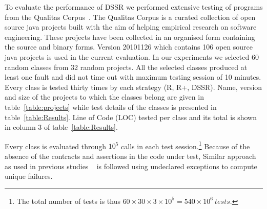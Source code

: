 \documentclass{acm_proc_article-sp}
\begin{document}
To evaluate the performance of DSSR we performed extensive testing of programs from the Qualitas Corpus~\cite{Tempero2010a}. The Qualitas Corpus is a curated collection of open source java projects built with the aim of helping empirical research on  software engineering. These projects have been collected in an organised form containing the source and binary forms. Version 20101126 which contains 106 open source java projects is used in the current evaluation. In our experiments we selected 60 random classes from 32 random projects. All the selected classes produced at least one fault and did not time out with maximum testing session of 10 minutes. Every class is tested thirty times by each strategy (R, R+, DSSR). Name, version and size of the projects to which the classes belong are given in table~\ref{table:projects} while test details of the classes is presented in table~\ref{table:Results}. Line of Code (LOC) tested per class and its total is shown in column 3 of table~\ref{table:Results}. 

Every class is evaluated through $10^5$ calls in each test session.\footnote{The total number of tests is thus $60\times 30\times 3 \times 10^5 = 540\times 10^6~tests$.} 
Because of the absence of the contracts and assertions in the code under test, Similar approach as used in previous studies ~\cite{Oriol2012} is followed using undeclared exceptions to compute unique failures.
\end{document}
